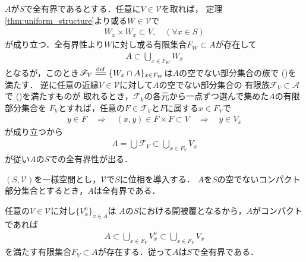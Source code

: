 	\begin{prf}
		$A$が$S$で全有界であるとする．任意に$V \in \mathscr{V}$を取れば，
		定理\ref{thm:uniform_structure}より或る$W \in \mathscr{V}$で
		\begin{align}
			W_x \times W_x \subset V,\quad (\forall x \in S)
		\end{align}
		が成り立つ．全有界性より$W$に対し或る有限集合$F_W \subset A$が存在して
		\begin{align}
			A \subset \bigcup_{x \in F_W} W_x
		\end{align}
		となるが，このとき$\mathscr{F}_V \defeq
		\{W_x \cap A\}_{x \in F_W}$は$A$の空でない部分集合の族で
		()を満たす．
		逆に任意の近縁$V \in \mathscr{V}$に対して$A$の空でない部分集合の
		有限族$\mathscr{F}_V \subset \mathscr{A}$で
		()を満たすものが
		取れるとき，$\mathscr{F}_V$の各元から一点ずつ選んで集めた$A$の有限部分集合を
		$F_V$とすれば，任意の$F \in \mathscr{F}_V$と$F$に属する$x \in F_V$で
		\begin{align}
			y \in F \quad \Longrightarrow \quad
			(x,y) \in F \times F \subset V \quad \Longrightarrow \quad
			y \in V_x
		\end{align}
		が成り立つから
		\begin{align}
			A = \bigcup \mathscr{F}_V \subset \bigcup_{x \in F_V} V_x
		\end{align}
		が従い$A$の$S$での全有界性が出る．
		\QED
	\end{prf}
	
	\begin{screen}
		\begin{thm}[全有界かつ可算な基本近縁系を持つ一様位相空間は可分かつ第二可算]
			
		\end{thm}
	\end{screen}
	
	\begin{screen}
		\begin{thm}[コンパクトなら全有界]\label{thm:compact_then_totally_bounded}
			$(S,\mathscr{V})$を一様空間とし，$\mathscr{V}$で$S$に位相を導入する．
			$A$を$S$の空でないコンパクト部分集合とするとき，$A$は全有界である．
		\end{thm}
	\end{screen}
	
	\begin{prf}
		任意の$V \in \mathscr{V}$に対し$\{V_x^{\mathrm{o}}\}_{x \in A}$は
		$A$の$S$における開被覆となるから，$A$がコンパクトであれば
		\begin{align}
			A \subset \bigcup_{x \in F_V} V_x^{\mathrm{o}} 
			\subset \bigcup_{x \in F_V} V_x
		\end{align}
		を満たす有限集合$F_V \subset A$が存在する．従って$A$は$S$で全有界である．
		\QED
	\end{prf}
	

